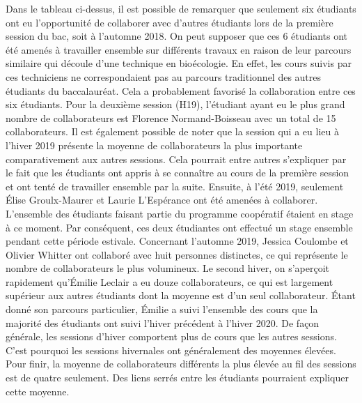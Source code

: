 \documentclass[12pt]{article}
\begin{document}
\begin{multicols}{2}
Dans le tableau ci-dessus, il est possible de remarquer que seulement six étudiants ont eu l’opportunité de collaborer avec d’autres étudiants lors de la première session du bac, soit à l’automne 2018. On peut supposer que ces 6 étudiants ont été amenés à travailler ensemble sur différents travaux en raison de leur parcours similaire qui découle d’une technique en bioécologie. En effet, les cours suivis par ces techniciens ne correspondaient pas au parcours traditionnel des autres étudiants du baccalauréat. Cela a probablement favorisé la collaboration entre ces six étudiants. Pour la deuxième session (H19), l’étudiant ayant eu le plus grand nombre de collaborateurs est Florence Normand-Boisseau avec un total de 15 collaborateurs. Il est également possible de noter que la session qui a eu lieu à l’hiver 2019 présente la moyenne de collaborateurs la plus importante comparativement aux autres sessions. Cela pourrait entre autres s’expliquer par le fait que les étudiants ont appris à se connaître au cours de la première session et ont tenté de travailler ensemble par la suite. Ensuite, à l’été 2019, seulement Élise Groulx-Maurer et Laurie L’Espérance ont été amenées à collaborer. L’ensemble des étudiants faisant partie du programme coopératif étaient en stage à ce moment. Par conséquent, ces deux étudiantes ont effectué un stage ensemble pendant cette période estivale. Concernant l’automne 2019, Jessica Coulombe et Olivier Whitter ont collaboré avec huit personnes distinctes, ce qui représente le nombre de collaborateurs le plus volumineux. Le second hiver, on s’aperçoit rapidement qu’Émilie Leclair a eu douze collaborateurs, ce qui est largement supérieur aux autres étudiants dont la moyenne est d’un seul collaborateur. Étant donné son parcours particulier, Émilie a suivi l’ensemble des cours que la majorité des étudiants ont suivi l’hiver précédent à l’hiver 2020. De façon générale, les sessions d’hiver comportent plus de cours que les autres sessions. C’est pourquoi les sessions hivernales ont généralement des moyennes élevées. Pour finir, la moyenne de collaborateurs différents la plus élevée au fil des sessions est de quatre seulement. Des liens serrés entre les étudiants pourraient expliquer cette moyenne. 
\end{multicols}
\clearpage


\end{document}
